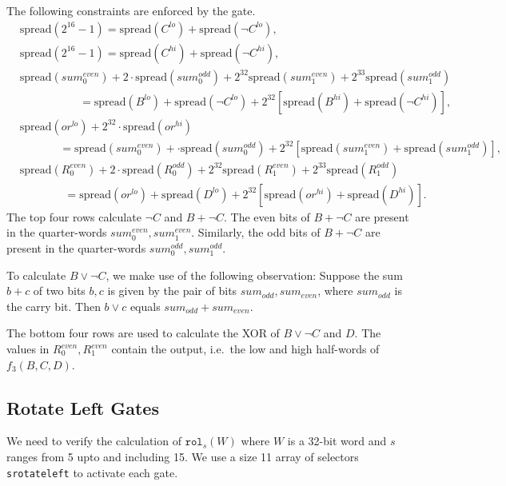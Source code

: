 \documentclass[10pt]{article}
\begin{document}
  The following constraints are enforced by the gate.
\begin{align*}
  & \text{spread}(2^{16}-1) = \text{spread} (C^{lo}) + \text{spread} (\lnot C^{lo}), \\
  & \text{spread}(2^{16}-1) = \text{spread} (C^{hi}) + \text{spread} (\lnot C^{hi}), \\
  & \text{spread}(sum_0^{even}) + 2\cdot \text{spread}(sum_0^{odd}) + 2^{32}\text{spread}(sum_1^{even}) + 2^{33}\text{spread}(sum_1^{odd})  \\
  &\ \ \ \ \ \ \ \ \ \ \ \ \ \ \ \ \ \ \ \ \ \ \ \ = \text{spread} (B^{lo}) +\text{spread} (\lnot C^{lo}) + 2^{32} \left[ \text{spread} (B^{hi}) +\text{spread} (\lnot C^{hi}) \right],\\
  & \text{spread} (or^{lo}) + 2^{32} \cdot \text{spread} (or^{hi})\\
  &\ \ \ \ \ \ \ \ \ \ \ \ \ \ \ \ = \text{spread}(sum_0^{even}) + \cdot \text{spread}(sum_0^{odd}) + 2^{32}\left[\text{spread}(sum_1^{even}) + \text{spread}(sum_1^{odd}) \right],\\
  & \text{spread}(R_0^{even}) + 2\cdot \text{spread}(R_0^{odd}) + 2^{32}\text{spread}(R_1^{even}) + 2^{33}\text{spread}(R_1^{odd})  \\
  &\ \ \ \ \ \ \ \ \ \ \ \ \ \ \ \ \ \ = \text{spread} (or^{lo}) +\text{spread} (D^{lo}) + 2^{32} \left[ \text{spread} (or^{hi}) +\text{spread} (D^{hi}) \right].
\end{align*}
The top four rows calculate $\lnot C$ and $B + \lnot C$. The even bits of $B+\lnot C$ are present in the quarter-words $sum_0^{even}, sum_1^{even}$. Similarly, the odd bits of $B+\lnot C$ are present in the quarter-words $sum_0^{odd}, sum_1^{odd}$.

To calculate $B \vee \lnot C$, we make use of the following observation: Suppose the sum $b+c$ of two bits $b,c$ is given by the pair of bits $sum_{odd}, sum_{even}$, where $sum_{odd}$ is the carry bit. Then $b \vee c$ equals $sum_{odd} + sum_{even}$.

The bottom four rows are used to calculate the XOR of $ B \vee \lnot C$ and $D$.
The values in $R_0^{even}, R_1^{even}$ contain the output, i.e.~the low and high half-words of $f_3(B,C,D)$.

\subsection{Rotate Left Gates}%
\label{sec:rotate_left_gates}
We need to verify the calculation of $\texttt{rol}_s(W)$ where $W$ is a 32-bit word and $s$ ranges from 5 upto and including 15. We use a size 11 array of selectors \texttt{s\textunderscore rotate\textunderscore left} to activate each gate.
\end{document}
